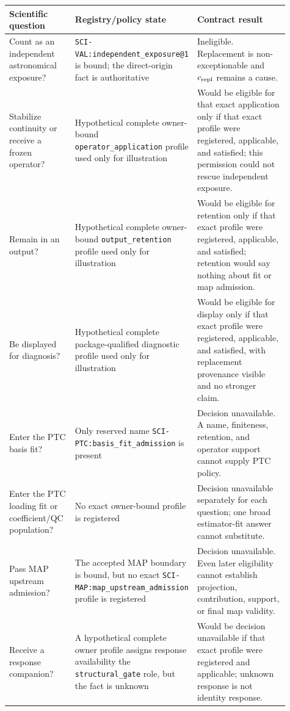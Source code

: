 \begin{center}
\begin{longtable}{p{0.24\linewidth}p{0.29\linewidth}p{0.38\linewidth}}
\toprule
Scientific question & Registry/policy state & Contract result \\
\midrule
\endhead
Count as an independent astronomical exposure? &
\nolinkurl{SCI-VAL:independent_exposure@1} is bound; the direct-origin fact is
authoritative & Ineligible. Replacement is non-exceptionable and
$c_{\rm repl}$ remains a cause. \\
Stabilize continuity or receive a frozen operator? & Hypothetical complete
owner-bound \texttt{operator\_application} profile used only for illustration
& Would be eligible for that exact application only if that exact profile
were registered, applicable, and satisfied; this permission could not rescue
independent exposure. \\
Remain in an output? & Hypothetical complete owner-bound
\texttt{output\_retention} profile used only for illustration & Would be
eligible for retention only if that exact profile were registered,
applicable, and satisfied; retention would say nothing about fit or map
admission. \\
Be displayed for diagnosis? & Hypothetical complete package-qualified
diagnostic profile used only for illustration & Would be eligible for display
only if that exact profile were registered, applicable, and satisfied, with
replacement provenance visible and no stronger claim. \\
Enter the PTC basis fit? & Only reserved name
\nolinkurl{SCI-PTC:basis_fit_admission} is present & Decision unavailable. A
name, finiteness, retention, and operator support cannot supply PTC policy. \\
Enter the PTC loading fit or coefficient/QC population? & No exact owner-bound
profile is registered & Decision unavailable separately for each question;
one broad estimator-fit answer cannot substitute. \\
Pass MAP upstream admission? & The accepted MAP boundary is bound, but no
exact \nolinkurl{SCI-MAP:map_upstream_admission} profile is registered &
Decision unavailable. Even later eligibility cannot establish projection,
contribution, support, or final map validity. \\
Receive a response companion? & A hypothetical complete owner profile assigns
response availability the \texttt{structural\_gate} role, but the fact is
unknown & Would be decision unavailable if that exact profile were registered
and applicable; unknown response is not identity response. \\
\bottomrule
\end{longtable}
\end{center}

